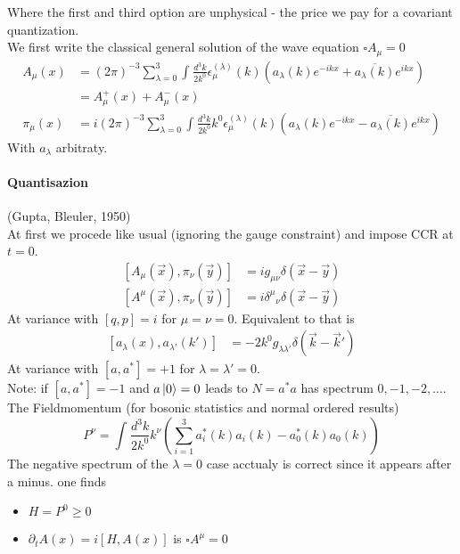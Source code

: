 \documentclass{report}
\begin{document}
Where the first and third option are unphysical - the price we pay for a covariant quantization.\\
We first write the classical general solution of the wave equation $\square A_\mu = 0$
\begin{align*}
  A_\mu\left( x \right) &= \left( 2 \pi \right) ^{-3} \sum_{\lambda = 0}^{3} \int_{}^{} \frac{d^3 k}{2 k^{0} } \epsilon_\mu^{\left( \lambda \right) } \left( k \right) \left( a_\lambda\left( k \right) e^{-ikx} + \overline{a_\lambda \left( k \right) } e^{ikx}  \right)    \\
  &= A^{+}_\mu\left( x \right) + A^{-}_\mu\left( x \right)  \\
  \pi_\mu\left( x \right) &= 
  i \left( 2 \pi \right) ^{-3} \sum_{\lambda = 0}^{3} \int_{}^{} \frac{d^3 k}{2 k^{0} } k^{0}  \epsilon_\mu^{\left( \lambda \right) } \left( k \right) \left( a_\lambda\left( k \right) e^{-ikx} - \overline{a_\lambda \left( k \right) } e^{ikx}  \right)  
\end{align*}
With $a_\lambda$ arbitraty.
\paragraph{Quantisazion} (Gupta, Bleuler, 1950)\\
At first we procede like usual (ignoring the gauge constraint) and impose CCR at $t = 0$. 
\begin{align*}
\left[ A_\mu\left( \vec{x} \right) , \pi_\nu \left( \vec{y} \right)  \right] &= i g_{\mu\nu}  \delta\left( \vec{x} - \vec{y} \right)  \\
\left[ A^{\mu} \left( \vec{x} \right) , \pi_\nu\left( \vec{y} \right)  \right] &= i \delta^{\mu} _{\text{ }\nu} \delta\left( \vec{x} - \vec{y} \right) 
\end{align*}
At variance with $\left[ q, p \right] = i$ for $\mu = \nu = 0$.
Equivalent to that is
\begin{align*}
  \left[ a_\lambda\left( x \right) , a_{\lambda'} \left( k' \right)  \right] &= -2 k^{0} g_{\lambda \lambda'} \delta\left( \vec{k} - \vec{k}' \right) 
\end{align*}
At variance with $\left[ a, a^{*}  \right] = +1$ for $\lambda = \lambda' = 0$.\\
Note: if $\left[ a, a^{*}  \right] = -1$ and $a \ket{0} = 0$ leads to $N = a^{*} a $ has spectrum $0,-1,-2,\ldots$.\\
The Fieldmomentum (for bosonic statistics and normal ordered results) \[
P^{\nu} = \int_{}^{} \frac{d^3 k}{2k^{0} } k^{\nu} \left( \sum_{i=1}^{3} a_i^{*} \left( k \right) a_i\left( k \right)  - a_0^{*} \left( k \right) a_0\left( k \right)  \right)  
\] The negative spectrum of the $\lambda = 0$ case acctualy is correct since it appears after a minus.
one finds
\begin{itemize}
  \item $H = P^{0} \ge 0$
  \item $\partial_t A\left( x \right) = i \left[ H, A\left( x \right)  \right]  $ is $\square A^{\mu} =0$
\end{itemize}
\end{document}
